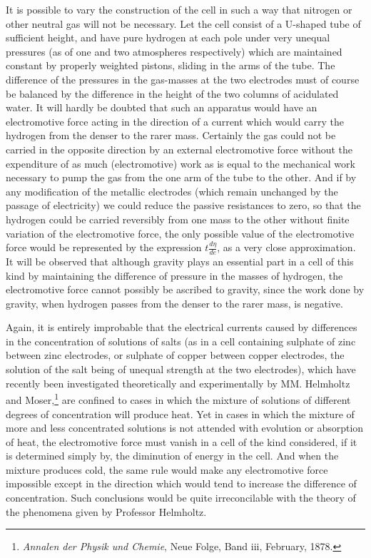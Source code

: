 \documentclass[12pt]{memoir}
\begin{document}
It is possible to vary the construction of the cell in such a way that nitrogen or other neutral gas will not be necessary. Let the cell consist of a U-shaped tube of sufficient height, and have pure hydrogen at each pole under very unequal pressures (as of one and two atmospheres respectively) which are maintained constant by properly weighted pistons, sliding in the arms of the tube. The difference of the pressures in the gas-masses at the two electrodes must of course be balanced by the difference in the height of the two columns of acidulated water. It will hardly be doubted that such an apparatus would have an electromotive force acting in the direction of a current which would carry the hydrogen from the denser to the rarer mass. Certainly the gas could not be carried in the opposite direction by an external electromotive force without the expenditure of as much (electromotive) work as is equal to the mechanical work necessary to pump the gas from the one arm of the tube to the other. And if by any modification of the metallic electrodes (which remain unchanged by the passage of electricity) we could reduce the passive resistances to zero, so that the hydrogen could be carried reversibly from one mass to the other without finite variation of the electromotive force, the only possible value of the electromotive force would be represented by the expression $t\frac{d\eta}{de}$, as a very close approximation. It will be observed that although gravity plays an essential part in a cell of this kind by maintaining the difference of pressure in the masses of hydrogen, the electromotive force cannot possibly be ascribed to gravity, since the work done by gravity, when hydrogen passes from the denser to the rarer mass, is negative.

Again, it is entirely improbable that the electrical currents caused by differences in the concentration of solutions of salts (as in a cell containing sulphate of zinc between zinc electrodes, or sulphate of copper between copper electrodes, the solution of the salt being of unequal strength at the two electrodes), which have recently been investigated theoretically and experimentally by MM. Helmholtz and Moser,\footnote{\textit{Annalen der Physik und Chemie}, Neue Folge, Band iii, February, 1878.} are confined to cases in which the mixture of solutions of different degrees of concentration will produce heat. Yet in cases in which the mixture of more and less concentrated solutions is not attended with evolution or absorption of heat, the electromotive force must vanish in a cell of the kind considered, if it is determined simply by, the diminution of energy in the cell. And when the mixture produces cold, the same rule would make any electromotive force impossible except in the direction which would tend to increase the difference of concentration. Such conclusions would be quite irreconcilable with the theory of the phenomena given by Professor Helmholtz.
\end{document}
